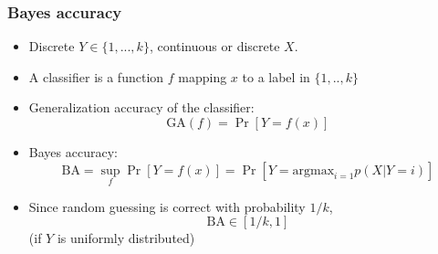 \documentclass{beamer}
\begin{document}
\begin{frame}
\frametitle{Bayes accuracy}
\begin{itemize}
\item Discrete $Y \in \{1,...,k\}$, continuous or discrete $X$.
\item A classifier is a function $f$ mapping $x$ to a label in $\{1,..,k\}$
\item Generalization accuracy of the classifier:
\[
\text{GA}(f) = \Pr[Y = f(x)]
\]
\item Bayes accuracy:
\[
\text{BA} = \sup_f \Pr[Y = f(x)] = \Pr[Y = \text{argmax}_{i=1} p(X|Y=i)]
\]
\item Since random guessing is correct with probability $1/k$,
\[
\text{BA} \in [1/k, 1]
\]
(if $Y$ is uniformly distributed)
\end{itemize}
\end{frame}
\end{document}
